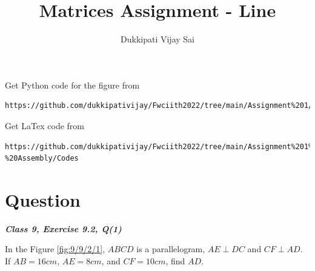 \documentclass[journal,12pt,twocolumn]{IEEEtran}
\begin{document}
\makeatother
\let\StandardTheFigure\thefigure
\let\vec\mathbf
\renewcommand{\thefigure}{\theproblem}
\def\putbox#1#2#3{\makebox[0in][l]{\makebox[#1][l]{}\raisebox{\baselineskip}[0in][0in]{\raisebox{#2}[0in][0in]{#3}}}}
     \def\rightbox#1{\makebox[0in][r]{#1}}
     \def\centbox#1{\makebox[0in]{#1}}
     \def\topbox#1{\raisebox{-\baselineskip}[0in][0in]{#1}}
     \def\midbox#1{\raisebox{-0.5\baselineskip}[0in][0in]{#1}}
\vspace{3cm}
\title{\textbf{Matrices Assignment - Line} }
\author{Dukkipati Vijay Sai}
\maketitle
\newpage
\bigskip
\renewcommand{\thefigure}{\theenumi}
\renewcommand{\thetable}{\theenumi}
Get Python code for the figure from 
\begin{lstlisting}
https://github.com/dukkipativijay/Fwciith2022/tree/main/Assignment%201/Codes/src
\end{lstlisting}
Get LaTex code from
\begin{lstlisting}
https://github.com/dukkipativijay/Fwciith2022/tree/main/Assignment%201%20-%20Assembly/Codes
\end{lstlisting}
%
\section{Question}
\centering
\textbf{\textit{Class 9, Exercise 9.2, Q(1)}}\\
\vspace{0.25cm}
\raggedright
\fi
In the Figure \ref{fig:9/9/2/1}, $ABCD$ is a parallelogram, $AE \perp DC$ and $CF \perp AD$. If $AB = 16 cm$, $AE = 8 cm$, and $CF = 10cm$, find $AD$.
		
\end{document}
